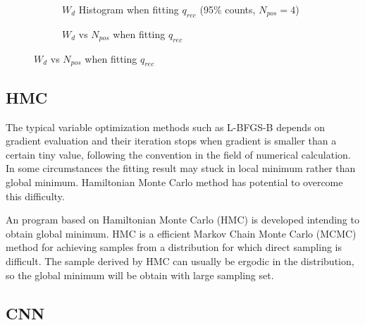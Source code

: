 \begin{figure}[H]
\begin{minipage}[t]{.5\textwidth}
\begin{figure}[H]
    \centering
    \resizebox{\textwidth}{!}{}
    \caption{\label{fig:fitting-hist} $W_{d}$ Histogram when fitting $q_{rec}$ (95\% counts, $N_{pos}=4$)}
\end{figure}
\end{minipage}
\begin{minipage}[t]{.5\textwidth}
\begin{figure}[H]
    \centering
    \resizebox{\textwidth}{!}{}
    \caption{\label{fig:fitting-npos} $W_{d}$ vs $N_{pos}$ when fitting $q_{rec}$}
\end{figure}
\end{minipage}
\end{figure}

\subsection{HMC}

The typical variable optimization methods such as L-BFGS-B depends on gradient evaluation and their iteration stops when gradient is smaller than a certain tiny value, following the convention in the field of numerical calculation. In some circumstances the fitting result may stuck in local minimum rather than global minimum. Hamiltonian Monte Carlo method has potential to overcome this difficulty. 

An program based on Hamiltonian Monte Carlo (HMC) is developed intending to obtain global minimum. HMC is a efficient Markov Chain Monte Carlo (MCMC) method for achieving samples from a distribution for which direct sampling is difficult\cite{neal_mcmc_2012}. The sample derived by HMC can usually be ergodic in the distribution, so the global minimum will be obtain with large sampling set. 

\subsection{CNN}



